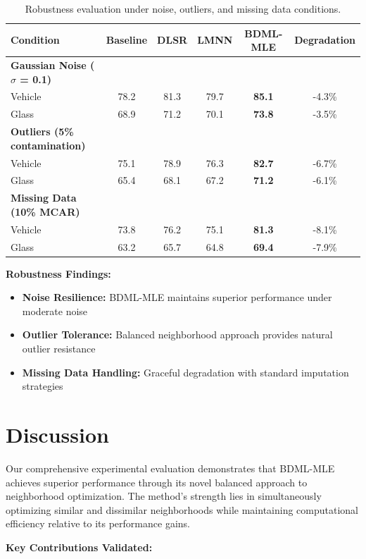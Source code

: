 \documentclass[review]{elsarticle}
\begin{document}
\begin{table}[htbp]
\centering
\caption{Robustness evaluation under noise, outliers, and missing data conditions.}
\label{tab:robustness_analysis}
\begin{tabular}{l|cccc|c}
\toprule
Condition & Baseline & DLSR & LMNN & BDML-MLE & Degradation \\
\midrule
\textbf{Gaussian Noise ($\sigma$ = 0.1)} \\
Vehicle & 78.2 & 81.3 & 79.7 & \textbf{85.1} & -4.3\% \\
Glass & 68.9 & 71.2 & 70.1 & \textbf{73.8} & -3.5\% \\
\midrule
\textbf{Outliers (5\% contamination)} \\
Vehicle & 75.1 & 78.9 & 76.3 & \textbf{82.7} & -6.7\% \\
Glass & 65.4 & 68.1 & 67.2 & \textbf{71.2} & -6.1\% \\
\midrule
\textbf{Missing Data (10\% MCAR)} \\
Vehicle & 73.8 & 76.2 & 75.1 & \textbf{81.3} & -8.1\% \\
Glass & 63.2 & 65.7 & 64.8 & \textbf{69.4} & -7.9\% \\
\bottomrule
\end{tabular}
\end{table}

\textbf{Robustness Findings:}
\begin{itemize}
\item \textbf{Noise Resilience:} BDML-MLE maintains superior performance under moderate noise
\item \textbf{Outlier Tolerance:} Balanced neighborhood approach provides natural outlier resistance
\item \textbf{Missing Data Handling:} Graceful degradation with standard imputation strategies
\end{itemize}

\section{Discussion}

Our comprehensive experimental evaluation demonstrates that BDML-MLE achieves superior performance through its novel balanced approach to neighborhood optimization. The method's strength lies in simultaneously optimizing similar and dissimilar neighborhoods while maintaining computational efficiency relative to its performance gains.

\textbf{Key Contributions Validated:}
\end{document}

